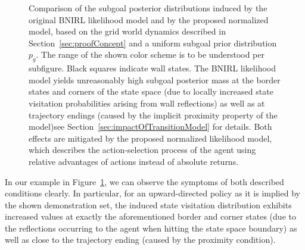 \documentclass[twoside,11pt]{article}
\newcommand{\nachschub}[1]{\Emdash*#1}
\begin{document}
\begin{figure}[p!]
	\caption{Comparison of the subgoal posterior distributions induced by the original BNIRL likelihood model and by the proposed normalized model, based on the grid world dynamics described in Section~\ref{sec:proofConcept} and a uniform subgoal prior distribution $p_g$. The range of the shown color scheme is to be understood per subfigure. Black squares indicate wall states. The BNIRL likelihood model yields unreasonably high subgoal posterior mass at the border states and corners of the state space (due to locally increased state visitation probabilities arising from wall reflections) as well as at trajectory endings (caused by the implicit proximity property of the model)\nachschub{see Section~\ref{sec:impactOfTransitionModel} for details}. %
		Both effects are mitigated by the proposed normalized likelihood model, which %
		describes the action-selection process of the agent using {relative advantages} of actions instead of absolute returns.}
	\label{fig:Qnormalization}
\end{figure}

In our example in Figure~\ref{fig:Qnormalization}, we can observe the %
symptoms of both described conditions clearly. In particular, for an upward-directed policy as it is implied by the shown demonstration set, %
the induced state visitation distribution %
exhibits increased values at exactly the aforementioned border and corner states (due to the %
reflections occurring to the agent when hitting the state space boundary) as well as close to the trajectory ending (caused by the proximity condition). %
%
%
\end{document}
